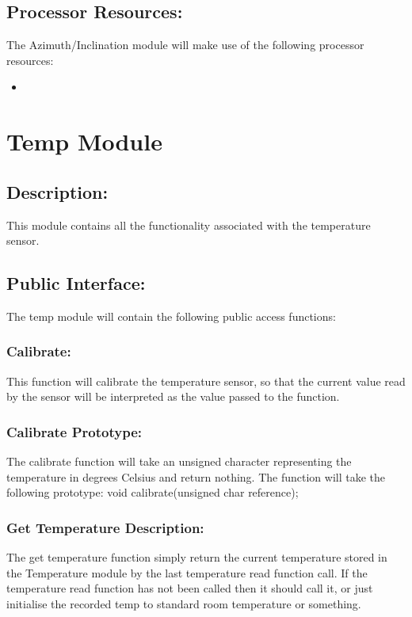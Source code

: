 \documentclass[]{article}
\begin{document}
\subsection{Processor Resources:}
The Azimuth/Inclination module will make use of the following processor resources:
\begin{itemize}
	\item 
\end{itemize}

\newpage
\section{Temp Module}

\subsection{Description:}
This module contains all the functionality associated with the temperature sensor.

\subsection{Public Interface:}
The temp module will contain the following public access functions:

\subsubsection{Calibrate:}
This function will calibrate the temperature sensor, so that the current value read by the sensor will be interpreted as the value passed to the function.

\subsubsection{Calibrate Prototype:}
The calibrate function will take an unsigned character representing the temperature in degrees Celsius and return nothing. The function will take the following prototype: \newline \newline
void calibrate(unsigned char reference);

\subsubsection{Get Temperature Description:}
The get temperature function simply return the current temperature stored in the Temperature module by the last temperature read function call. If the temperature read function has not been called then it should call it, or just initialise the recorded temp to standard room temperature or something.
\end{document}

